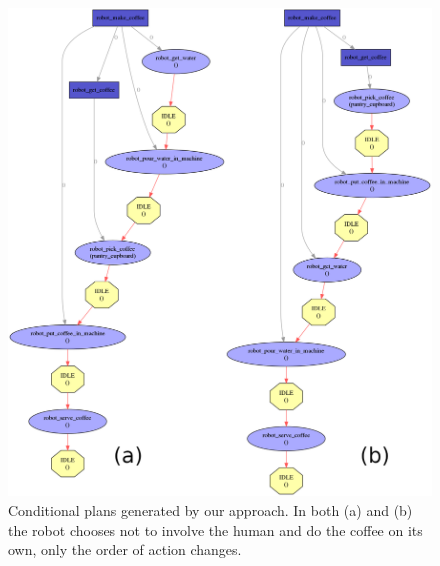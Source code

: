 \documentclass[a4paper,11pt,twoside]{StyleThese}
\begin{document}
\begin{figure}[hbtp]
\centering
\includegraphics[width=\textwidth]{figures/chapter4/Chapt4SimplePlanHierarchy.png}
\caption{Conditional plans generated by our approach. In both (a) and (b) the robot chooses not to involve the human and do the coffee on its own, only the order of action changes.}
\label{fig:chap4coffeesimplerobotonly}
\end{figure}
\end{document}
